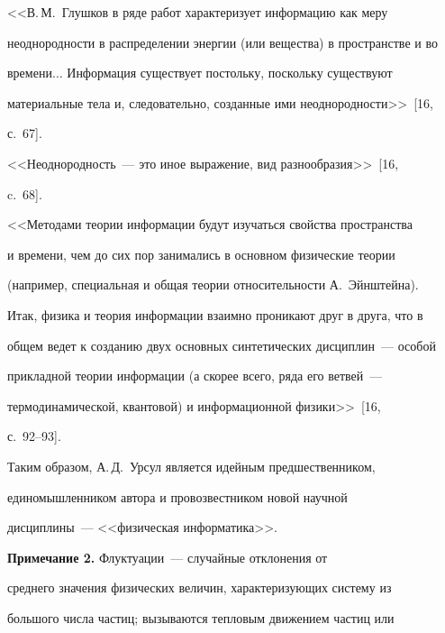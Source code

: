 {   <<В.\,М.~Глушков в ряде работ характеризует информацию как меру 


неоднородности в распределении энергии (или вещества) в пространстве и во 


времени$\ldots$ Информация существует постольку, поскольку существуют 


материальные тела и, следовательно, созданные ими неоднородности>>~[16, 


с.~67].


   


   <<Неоднородность~--- это иное выражение, вид разнообразия>>~[16, 


c.~68].


   


   <<Методами теории информации будут изучаться свойства пространства 


и времени, чем до сих пор занимались в основном физические теории 


(например, специальная и общая теории относительности А.~Эйнштейна). 


Итак, физика и теория информации взаимно проникают друг в друга, что в 


общем ведет к созданию двух основных синтетических дисциплин~--- особой 


прикладной теории информации (а скорее всего, ряда его ветвей~--- 


термодинамической, квантовой) и информационной физики>>~[16, 


   с.~92--93].


   


   Таким образом, А.\,Д.~Урсул является идейным предшественником, 


единомышленником автора и провозвестником новой научной 


   дисциплины~--- <<физическая информатика>>.


   


\smallskip





\noindent 


\textbf{Примечание 2.} Флуктуации~--- случайные отклонения от 


среднего значения физических величин, характеризующих систему из 


большого числа частиц; вызываются тепловым движением частиц или 


}
